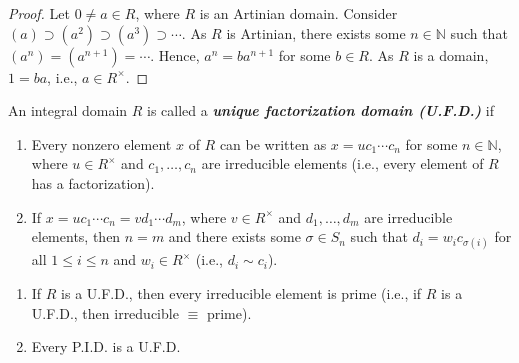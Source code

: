 \documentclass[twoside]{article}
\newcommand\N{\mathbb N}
\theoremstyle{remark}
\newcounter{theorem}
\newcommand*\term[1]{\textbf{\textit{\mathversion{bold}#1}}}
\begin{document}
\begin{proof}
  Let \(0 \neq a \in R\), where \(R\) is an Artinian domain. Consider \((a) \supset (a^2) \supset (a^3) \supset \cdots\). As \(R\) is Artinian, there exists some \(n \in \N\) such that \((a^n) = (a^{n+1}) = \cdots\). Hence, \(a^n = ba^{n+1}\) for some \(b \in R\). As \(R\) is a domain, \(1 = ba\), i.e., \(a \in R^\times\).
\end{proof}

\begin{definition}%
  An integral domain \(R\) is called a \term{unique factorization domain (U.F.D.)} if
  \begin{enumerate}[label=\arabic*.]
    \item Every nonzero element \(x\) of \(R\) can be written as \(x = u c_1 \cdots c_n\) for some \(n \in \N\), where \(u \in R^\times\) and \(c_1, \dots, c_n\) are irreducible elements (i.e., every element of \(R\) has a factorization).
    \item If \(x = u c_1 \cdots c_n = v d_1 \cdots d_m\), where \(v \in R^\times\) and \(d_1, \dots, d_m\) are irreducible elements, then \(n=m\) and there exists some \(\sigma \in S_n\) such that \(d_i = w_i c_{\sigma(i)}\) for all \(1 \leq i \leq n\) and \(w_i \in R^\times\) (i.e., \(d_i \sim c_i\)).
  \end{enumerate}
\end{definition}

\begin{theorem}
  \begin{enumerate}[label=\textup{(\arabic*)}, nosep]
    \item If \(R\) is a U.F.D., then every irreducible element is prime (i.e., if \(R\) is a U.F.D., then irreducible \(\equiv\) prime).
    \item Every P.I.D. is a U.F.D.\@
  \end{enumerate}
\end{theorem}
\end{document}
